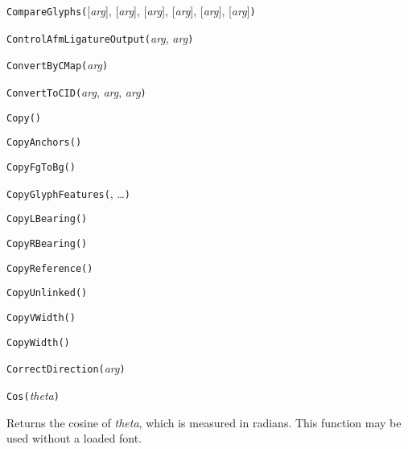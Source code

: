 
\noindent\texttt{CompareGlyphs(}[\textit{arg}], [\textit{arg}], [\textit{arg}], [\textit{arg}], [\textit{arg}], [\textit{arg}]\texttt{)}


\noindent\texttt{ControlAfmLigatureOutput(}\textit{arg}, \textit{arg}\texttt{)}


\noindent\texttt{ConvertByCMap(}\textit{arg}\texttt{)}


\noindent\texttt{ConvertToCID(}\textit{arg}, \textit{arg}, \textit{arg}\texttt{)}


\noindent\texttt{Copy(}\texttt{)}


\noindent\texttt{CopyAnchors(}\texttt{)}


\noindent\texttt{CopyFgToBg(}\texttt{)}


\noindent\texttt{CopyGlyphFeatures(}, \ldots\texttt{)}


\noindent\texttt{CopyLBearing(}\texttt{)}


\noindent\texttt{CopyRBearing(}\texttt{)}


\noindent\texttt{CopyReference(}\texttt{)}


\noindent\texttt{CopyUnlinked(}\texttt{)}


\noindent\texttt{CopyVWidth(}\texttt{)}


\noindent\texttt{CopyWidth(}\texttt{)}


\noindent\texttt{CorrectDirection(}\textit{arg}\texttt{)}


\noindent\texttt{Cos(}\textit{theta}\texttt{)}

Returns the cosine of \textit{theta}, which is measured in radians.
This function may be used without a loaded font.

